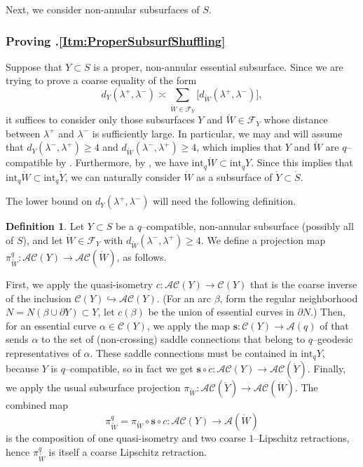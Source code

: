 \documentclass[11pt,letterpaper]{amsart}
\newcommand{\A}[0]{\mathcal{A}}
\newcommand{\mc}{\mathcal}
\newcommand{\mr}{\mathring}
\newcommand{\bdy}{\partial} %
\newcommand{\psub}{\mr W}
\numberwithin{equation}{section}
\theoremstyle{definition}
\newtheorem{definition}[theorem]{Definition}
\newcommand{\C}{\mathcal{C}}
\newcommand{\AC}{\mathcal{AC}}
\newcommand{\from}{\colon} %
\renewcommand{\int}{\mathrm{int}}
\begin{document}
Next, we consider non-annular subsurfaces of $S$.

\subsubsection{Proving .\eqref{Itm:ProperSubsurfShuffling}}
Suppose that $Y \subset S$ is a proper, non-annular essential subsurface. Since we are trying to prove a coarse equality of the form
\[
 d_Y(\lambda^+, \lambda^-) \asymp 
\sum_{\psub \in \mc F_Y} \big[ d_{\psub}(\lambda^+,\lambda^-) \big],
\]
it suffices to consider only those subsurfaces $Y$ and $\psub  \in \mc F_Y$ whose distance between $\lambda^+$ and $\lambda^-$ is sufficiently large. In particular, we may and will assume that $d_{Y}(\lambda^-, \lambda^+) \geq 4$ and $d_{\psub}(\lambda^-, \lambda^+) \geq 4$, which implies that $Y$ and $\psub$ are $q$--compatible by   . 
Furthermore, by , we have $\int_q \psub \subset \int_q Y$. Since this implies that $\int_q \psub \subset \int_q \mr Y$, we can naturally consider $\psub $ as a subsurface of $\mr Y \subset \mr S$.



The lower bound on $d_Y(\lambda^+, \lambda^-)$ will need the following definition.

\begin{definition}\label{Def:QProjection}
Let $Y \subset S$ be a $q$--compatible, non-annular subsurface (possibly all of $S$), and let $\psub \in \mc F_Y$ with $d_{\psub}(\lambda^-, \lambda^+) \geq 4$. 
We define a projection  map $\pi^{q}_{\psub} \from \AC(Y) \to \AC(\psub)$, as follows. 

First, we apply the quasi-isometry $c \from \AC(Y) \to \C(Y)$ that is the coarse inverse of the inclusion $\C(Y) \hookrightarrow \AC(Y)$. (For an arc $\beta$,  form the regular neighborhood $N = N(\beta \cup \bdy Y) \subset Y$, let $c(\beta)$ be the union of essential curves in $\bdy N$.)
Then, for an essential curve $\alpha \in \C(Y)$, we apply the map 
$\mathbf{s} \from \C(Y) \to \A(q)$  of   that sends $\alpha$ to the set of (non-crossing) saddle connections that belong to $q$--geodesic representatives of $\alpha$.
 These saddle connections must be contained in $\int_q Y$, because $Y$ is $q$--compatible, so in fact we get $\mathbf{s} \circ c \from \AC(Y) \to \AC(\mr Y)$. Finally, we apply the usual subsurface projection $\pi_{\psub} \from \AC(\mr Y) \to \AC(\psub)$. The combined map 
 \[
\pi^{q}_{\psub} = \pi_{\psub} \circ  \mathbf{s} \circ c \from \AC(Y) \to \A(\psub)
\]
 is the composition of one quasi-isometry and two coarse $1$--Lipschitz retractions, hence $\pi^{q}_{\psub}$ is itself a coarse Lipschitz retraction. 
\end{definition}
\end{document}

